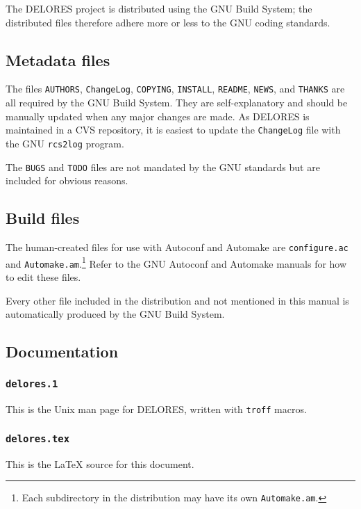 \documentclass[a4paper,10pt,twocolumn]{article}
\begin{document}
The DELORES project is distributed using the GNU Build System; the
distributed files therefore adhere more or less to the GNU coding
standards.

\subsection{Metadata files}

The files \texttt{AUTHORS}, \texttt{ChangeLog}, \texttt{COPYING},
\texttt{INSTALL}, \texttt{README}, \texttt{NEWS}, and \texttt{THANKS}
are all required by the GNU Build System.  They are self-explanatory
and should be manually updated when any major changes are made.  As
DELORES is maintained in a CVS repository, it is easiest to update the
\texttt{ChangeLog} file with the GNU \texttt{rcs2log} program.

The \texttt{BUGS} and \texttt{TODO} files are not mandated by the GNU
standards but are included for obvious reasons.

\subsection{Build files}

The human-created files for use with Autoconf and Automake are
\texttt{configure.ac} and \texttt{Automake.am}.\footnote{Each
  subdirectory in the distribution may have its own
  \texttt{Automake.am}.}  Refer to the GNU Autoconf and Automake
manuals for how to edit these files.

Every other file included in the distribution and not mentioned in
this manual is automatically produced by the GNU Build System.

\subsection{Documentation}

\subsubsection{\texttt{delores.1}}

This is the Unix man page for DELORES, written with \texttt{troff}
macros.

\subsubsection{\texttt{delores.tex}}

This is the \LaTeX{} source for this document.
\end{document}
